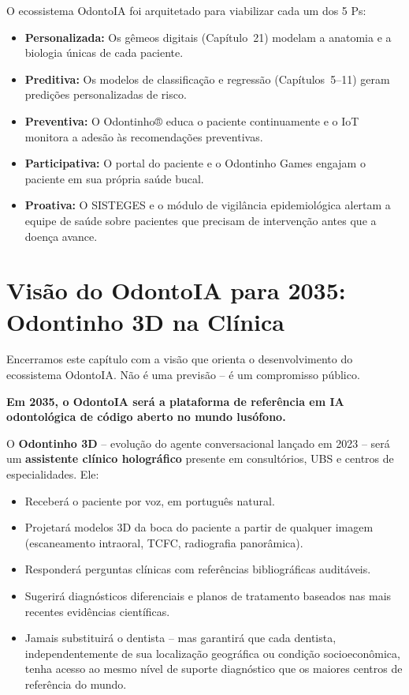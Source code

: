 O ecossistema OdontoIA foi arquitetado para viabilizar cada um dos 5 Ps:

\begin{itemize}
  \item \textbf{Personalizada:} Os gêmeos digitais (Capítulo~21) modelam a
    anatomia e a biologia únicas de cada paciente.
  \item \textbf{Preditiva:} Os modelos de classificação e regressão
    (Capítulos~5--11) geram predições personalizadas de risco.
  \item \textbf{Preventiva:} O Odontinho® educa o paciente continuamente e o
    IoT monitora a adesão às recomendações preventivas.
  \item \textbf{Participativa:} O portal do paciente e o Odontinho Games
    engajam o paciente em sua própria saúde bucal.
  \item \textbf{Proativa:} O SISTEGES e o módulo de vigilância epidemiológica
    alertam a equipe de saúde sobre pacientes que precisam de intervenção antes
    que a doença avance.
\end{itemize}


\section{Visão do OdontoIA para 2035: Odontinho 3D na Clínica}
\label{sec:visao-2035}

\nivelzero

Encerramos este capítulo com a visão que orienta o desenvolvimento do
ecossistema OdontoIA. Não é uma previsão -- é um compromisso público.

\textbf{Em 2035, o OdontoIA será a plataforma de referência em IA odontológica
de código aberto no mundo lusófono.}

O \textbf{Odontinho 3D} -- evolução do agente conversacional lançado em 2023 --
será um \textbf{assistente clínico holográfico} presente em consultórios, UBS e
centros de especialidades. Ele:
\begin{itemize}
  \item Receberá o paciente por voz, em português natural.
  \item Projetará modelos 3D da boca do paciente a partir de qualquer imagem
    (escaneamento intraoral, TCFC, radiografia panorâmica).
  \item Responderá perguntas clínicas com referências bibliográficas auditáveis.
  \item Sugerirá diagnósticos diferenciais e planos de tratamento baseados nas
    mais recentes evidências científicas.
  \item Jamais substituirá o dentista -- mas garantirá que cada dentista,
    independentemente de sua localização geográfica ou condição socioeconômica,
    tenha acesso ao mesmo nível de suporte diagnóstico que os maiores centros
    de referência do mundo.
\end{itemize}

